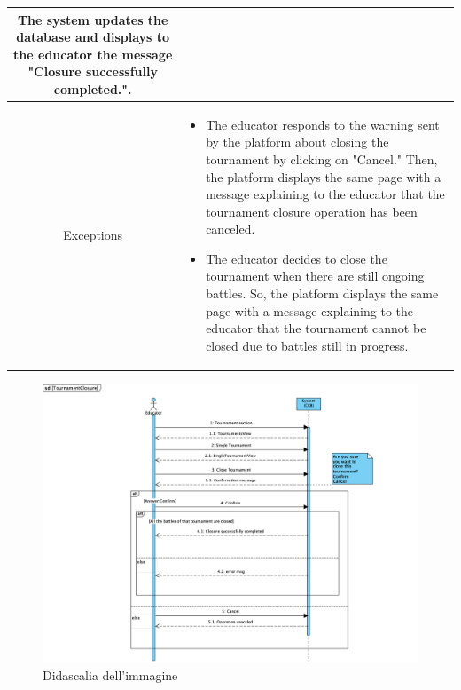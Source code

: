 \begin{longtable}{|c| p{10cm}|}
            The system updates the database and displays to the educator the message "Closure successfully completed.".
            \\
        \hline
         Exceptions &\begin{itemize}
             \item The educator responds to the warning sent by the platform about closing the tournament by clicking on "Cancel." Then, the platform displays the same page with a message explaining to the educator that the tournament closure operation has been canceled.
             \item The educator decides to close the tournament when there are still ongoing battles. So, the platform displays the same page with a message explaining to the educator that the tournament cannot be closed due to battles still in progress.
         \end{itemize} \\
             \hline
         
            
    \end{longtable}


    \begin{figure}[H]
  \includegraphics[width=1\linewidth]{SequenceDiagram/TournamentClosure.png} 
  \caption{Didascalia dell'immagine}
  \label{fig:immagine}
\end{figure}


